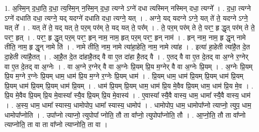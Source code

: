 \documentclass[17pt]{extarticle}
\begin{document}
1. अ॒स्मि॒न् द॒धा॒ति॒ द॒धा॒ त्य॒स्मि॒न् न॒स्मि॒न् द॒धा॒ त्यग्ने ऽग्ने॑ दधा त्यस्मिन् नस्मिन् दधा॒ त्यग्ने᳚ । . द॒धा॒ त्यग्ने ऽग्ने॑ दधाति दधा॒ त्यग्ने॒ यद् यदग्ने॑ दधाति दधा॒ त्यग्ने॒ यत् । . अग्ने॒ यद् यदग्ने ऽग्ने॒ यत् ते॑ ते॒ यदग्ने ऽग्ने॒ यत् ते᳚ । . यत् ते॑ ते॒ यद् यत् ते॒ पर॒म् पर॑म् ते॒ यद् यत् ते॒ पर᳚म् । . ते॒ पर॒म् पर॑म् ते ते॒ परꣳ॒॒ हृ द्धृत् पर॑म् ते ते॒ परꣳ॒॒ हृत् । . परꣳ॒॒ हृ द्धृत् पर॒म् परꣳ॒॒ हृन् नाम॒ नाम॒ हृत् पर॒म् परꣳ॒॒ हृन् नाम॑ । . हृन् नाम॒ नाम॒ हृ द्धृन् नामे तीति॒ नाम॒ हृ द्धृन् नामे ति॑ । . नामे तीति॒ नाम॒ नामे त्या॑हा॒हेति॒ नाम॒ नामे त्या॑ह । . इत्या॑ हा॒हेती त्या॑है॒त दे॒त दा॒हेती त्या॑है॒तत् । . आ॒है॒त दे॒त दा॑हाहै॒तद् वै वा ए॒त दा॑हा है॒तद् वै । . ए॒तद् वै वा ए॒त दे॒तद् वा अ॒ग्ने र॒ग्नेर् वा ए॒त दे॒तद् वा अ॒ग्नेः । . वा अ॒ग्ने र॒ग्नेर् वै वा अ॒ग्नेः प्रि॒यम् प्रि॒य म॒ग्नेर् वै वा अ॒ग्नेः प्रि॒यम् । . अ॒ग्नेः प्रि॒यम् प्रि॒य म॒ग्ने र॒ग्नेः प्रि॒यम् धाम॒ धाम॑ प्रि॒य म॒ग्ने र॒ग्नेः प्रि॒यम् धाम॑ । . प्रि॒यम् धाम॒ धाम॑ प्रि॒यम् प्रि॒यम् धाम॑ प्रि॒यम् प्रि॒यम् धाम॑ प्रि॒यम् प्रि॒यम् धाम॑ प्रि॒यम् । . धाम॑ प्रि॒यम् प्रि॒यम् धाम॒ धाम॑ प्रि॒य मे॒वैव प्रि॒यम् धाम॒ धाम॑ प्रि॒य मे॒व । . प्रि॒य मे॒वैव प्रि॒यम् प्रि॒य मे॒वास्या᳚ स्यै॒व प्रि॒यम् प्रि॒य मे॒वास्य॑ । . ए॒वास्या᳚ स्यै॒वै वास्य॒ धाम॒ धामा᳚ स्यै॒वै वास्य॒ धाम॑ । . अ॒स्य॒ धाम॒ धामा᳚ स्यास्य॒ धामोपोप॒ धामा᳚ स्यास्य॒ धामोप॑ । . धामोपोप॒ धाम॒ धामोपा᳚प्नो त्याप्नो॒ त्युप॒ धाम॒ धामोपा᳚प्नोति । . उपा᳚प्नो त्याप्नो॒ त्युपोपा᳚ प्नोति॒ तौ ता वा᳚प्नो॒ त्युपोपा᳚प्नोति॒ तौ । . आ॒प्नो॒ति॒ तौ ता वा᳚प्नो त्याप्नोति॒ ता वा ता वा᳚प्नो त्याप्नोति॒ ता वा । \newline
\end{document}
